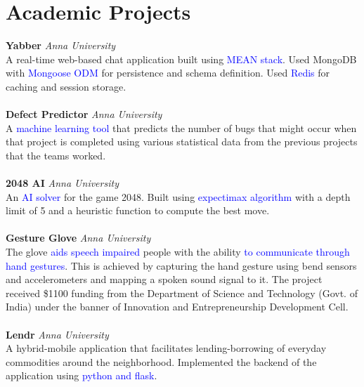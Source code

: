 \documentclass{resume}
\begin{document}
\section*{Academic Projects}
\noindent
\textbf{Yabber} \hfill \textit{Anna University} \\
A real-time web-based chat application built using \textcolor{blue}{MEAN stack}. Used MongoDB with \textcolor{blue}{Mongoose ODM} for persistence and schema definition. Used \textcolor{blue}{Redis} for caching and session storage.  \\
\\
\textbf{Defect Predictor} \hfill \textit{Anna University} \\
A \textcolor{blue}{machine learning tool} that predicts the number of bugs that might occur when that project is completed using various statistical data from the previous projects that the teams worked.\\
\\
\textbf{2048 AI} \hfill \textit{Anna University} \\
An \textcolor{blue}{AI solver} for the game 2048. Built using \textcolor{blue}{expectimax algorithm} with a depth limit of 5 and a heuristic function to compute the best move. \\
\\
\textbf{Gesture Glove} \hfill \textit{Anna University} \\
The glove \textcolor{blue}{aids speech impaired} people with the ability \textcolor{blue}{to communicate through hand gestures}. This is achieved by capturing the hand gesture using bend sensors and accelerometers and mapping a spoken sound signal to it. The project received \$1100 funding from the Department of Science and Technology (Govt. of India) under the banner of Innovation and Entrepreneurship Development Cell.\\
\\
\textbf{Lendr} \hfill \textit{Anna University} \\
A hybrid-mobile application that facilitates lending-borrowing of everyday commodities around the neighborhood. Implemented the backend of the application using \textcolor{blue}{python and flask}. 
\end{document}
